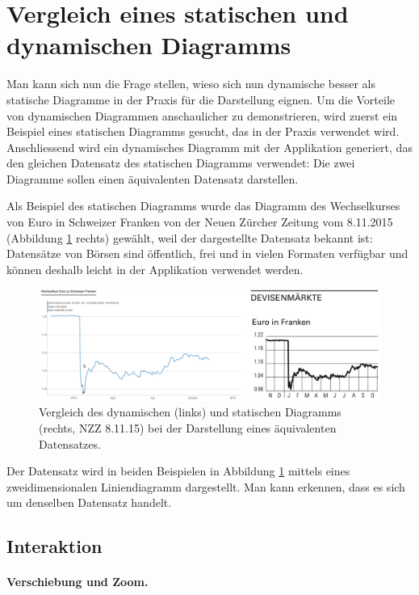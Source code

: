 
\section{Vergleich eines statischen und dynamischen Diagramms}

Man kann sich nun die Frage stellen, wieso sich nun dynamische besser als statische Diagramme in der Praxis für die Darstellung eignen. Um die Vorteile von dynamischen Diagrammen anschaulicher zu demonstrieren, wird zuerst ein Beispiel eines statischen Diagramms gesucht, das in der Praxis verwendet wird. Anschliessend wird ein dynamisches Diagramm mit der Applikation generiert, das den gleichen Datensatz des statischen Diagramms verwendet: Die zwei Diagramme sollen einen äquivalenten Datensatz darstellen.

Als Beispiel des statischen Diagramms wurde das Diagramm des Wechselkurses von Euro in Schweizer Franken von der Neuen Zürcher Zeitung vom 8.11.2015 (Abbildung \ref{fig:finance} rechts) gewählt, weil der dargestellte Datensatz bekannt ist: Datensätze von Börsen sind öffentlich, frei und in vielen Formaten verfügbar und können deshalb leicht in der Applikation verwendet werden.

\begin{figure}[H]
	\centering
	\includegraphics[width=\linewidth]{images/finance}
	\caption[Vergleich des dynamischen und statischen Diagramms]{Vergleich des dynamischen (links) und statischen Diagramms (rechts, NZZ 8.11.15) bei der Darstellung eines äquivalenten Datensatzes.}
	\label{fig:finance}
\end{figure}

Der Datensatz wird in beiden Beispielen in Abbildung \ref{fig:finance} mittels eines zweidimensionalen Liniendiagramm dargestellt. Man kann erkennen, dass es sich um denselben Datensatz handelt.

\subsection{Interaktion}

\paragraph{Verschiebung und Zoom.}

